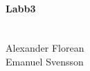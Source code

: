 \documentclass{article}
\begin{document}
\paragraph{Labb3} 
\\
Alexander Florean \\
Emanuel Svensson





\end{document}
